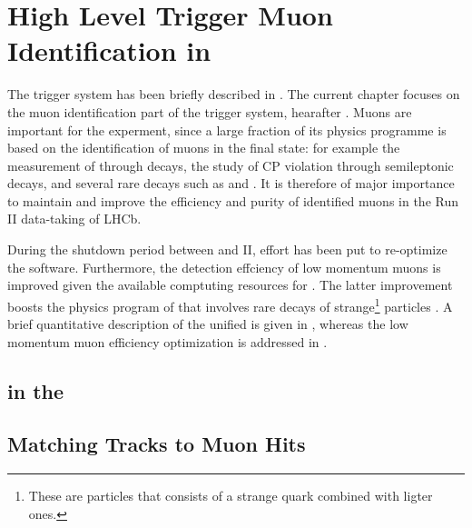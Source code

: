 \chapter{High Level Trigger Muon Identification in \runtwo}
\label{Muon_id_hlt}

The \lhcb trigger system has been briefly described in . The current chapter focuses on the muon identification
part of the trigger system, hearafter \muonID. Muons are important for the \lhcb experment, since a large fraction of its physics programme is based on
the identification of muons in the final state: for example the measurement of \phis through \BsJpsiPhi decays, the study of CP
violation through semileptonic decays, and several rare decays such as \BdKstmumu and \Bsmm.
It is therefore of major importance to maintain and improve the efficiency and purity of identified muons in the Run II data-taking of LHCb.

During the shutdown period between \runone and II, effort has been put to re-optimize the \muonID software.
Furthermore, the detection effciency of low momentum muons is improved given the available
comptuting resources for \runtwo. The latter improvement boosts the physics program of \lhcb that involves
rare decays of strange\footnote{These are particles that consists of a strange quark combined with ligter ones.}
particles \eg \cite{LHCB-CONF-2016-013-001,LHCb-CONF-2016-012}. A brief quantitative description of the unified
\muonID is given in , whereas the low momentum muon efficiency optimization is addressed in .

\section{\hltone \muonID in the \lhc \runtwo}
\label{muid_hlt1}


\section{Matching \velo Tracks to Muon Hits}
\label{mvm_algorrithm}

